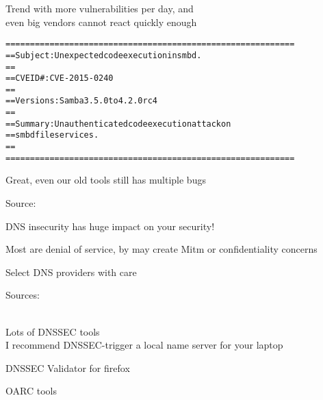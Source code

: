 \documentclass[20pt,landscape,a4paper,footrule]{foils}
\begin{document}
Trend with more vulnerabilities per day, and\\
even big vendors cannot react quickly enough




\begin{alltt}\small
  ===========================================================
  == Subject:     Unexpected code execution in smbd.
  ==
  == CVE ID#:     CVE-2015-0240
  ==
  == Versions:    Samba 3.5.0 to 4.2.0rc4
  ==
  == Summary:     Unauthenticated code execution attack on
  ==		smbd file services.
  ==
  ===========================================================
\end{alltt}

\centerline{Great, even our old tools still has multiple bugs}

Source:\\



\begin{list1}
\item DNS insecurity has huge impact on your security!
\item Most are denial of service, by may create Mitm or confidentiality concerns
\item Select DNS providers with care
\end{list1}


Sources:\\
{\tiny
{}\\
}




Lots of DNSSEC tools\\
I recommend DNSSEC-trigger a local name server for your laptop

\begin{list2}
\item DNSSEC Validator for firefox\\ 
\item OARC tools 
\item {}
\end{list2}
\end{document}
